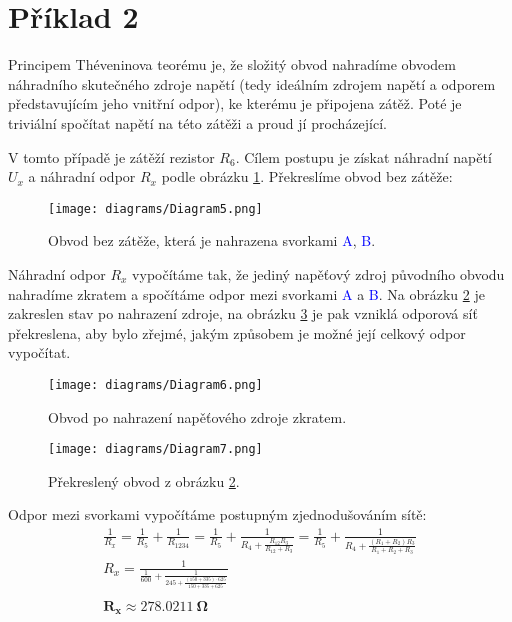 \section{Příklad 2}

Principem Théveninova teorému je, že složitý obvod nahradíme obvodem náhradního skutečného zdroje napětí (tedy ideálním zdrojem napětí a odporem představujícím jeho vnitřní odpor), ke kterému je připojena zátěž. Poté je triviální spočítat napětí na této zátěži a proud jí procházející.

V tomto případě je zátěží rezistor $R_6$. Cílem postupu je získat náhradní napětí $U_x$ a náhradní odpor $R_x$ podle obrázku \ref{fig:circ-2-1}. Překreslíme obvod bez zátěže:
\begin{figure}[H]
    \centering
    \texttt{[image: diagrams/Diagram5.png]}
    \caption{Obvod bez zátěže, která je nahrazena svorkami \textcolor{blue}{A}, \textcolor{blue}{B}.}
    \label{fig:circ-2-1}
\end{figure}

Náhradní odpor $R_x$ vypočítáme tak, že jediný napěťový zdroj původního obvodu nahradíme zkratem a spočítáme odpor mezi svorkami \textcolor{blue}{A} a \textcolor{blue}{B}. Na obrázku \ref{fig:circ-2-2} je zakreslen stav po nahrazení zdroje, na obrázku \ref{fig:circ-2-3} je pak vzniklá odporová síť překreslena, aby bylo zřejmé, jakým způsobem je možné její celkový odpor vypočítat.
\begin{figure}[htb]
    \centering
    \texttt{[image: diagrams/Diagram6.png]}
    \caption{Obvod po nahrazení napěťového zdroje zkratem.}
    \label{fig:circ-2-2}
\end{figure}
\begin{figure}[htb]
    \centering
    \texttt{[image: diagrams/Diagram7.png]}
    \caption{Překreslený obvod z obrázku \ref{fig:circ-2-2}.}
    \label{fig:circ-2-3}
\end{figure}

Odpor mezi svorkami vypočítáme postupným zjednodušováním sítě:
\begin{gather*}
    \frac{1}{R_x} = \frac{1}{R_5} + \frac{1}{R_{1234}} = \frac{1}{R_5} + \frac{1}{\displaystyle R_4 + \frac{R_{12} R_3}{R_{12} + R_3}} = \frac{1}{R_5} + \frac{1}{\displaystyle R_4 + \frac{(R_1+R_2)R_3}{R_1 + R_2 + R_3}} \\
    R_x = \frac{1}{\displaystyle \frac{1}{600} + \frac{1}{245 + \frac{(150+335)\cdot 625}{150 + 335 + 625}}} \\
    \\
    \mathbf{R_x \approx \SI{278.0211}{\ohm}}
\end{gather*}

